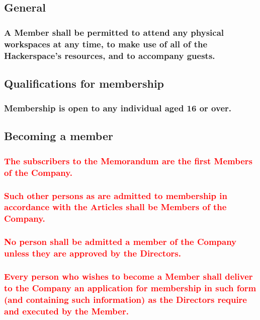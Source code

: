 \documentclass[12pt]{article}
\begin{document}
\subsection{General}
\subsubsection[Members' access to resources]{A Member shall be permitted to attend any physical workspaces at any time, to make use of all of the Hackerspace's resources, and to accompany guests.}

\subsection{Qualifications for membership}
\subsubsection{Membership is open to any individual aged 16 or over.}

\subsection{Becoming a member}
\subsubsection[First Members of the Company]{\textcolor{red}{The subscribers to the Memorandum are the first Members of the Company.}}
\subsubsection[Members are admitted in accordance with Articles]{\textcolor{red}{Such other persons as are admitted to membership in accordance with the Articles shall be Members of the Company.}}
\subsubsection[Potential Members must be approved by Directors]{\textcolor{red}{No person shall be admitted a member of the Company unless they are approved by the Directors.}}
\subsubsection[Potential Members must apply for membership]{\textcolor{red}{Every person who wishes to become a Member shall deliver to the Company an application for membership in such form (and containing such information) as the Directors require and executed by the Member.}} %
\end{document}

